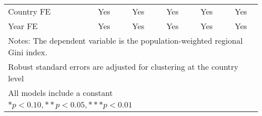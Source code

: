 {\begin{tabular}{l*{5}{c}}
Country FE          &         Yes         &         Yes         &         Yes         &         Yes         &         Yes         \\
Year FE             &         Yes         &         Yes         &         Yes         &         Yes         &         Yes         \\
\hline\hline
\multicolumn{6}{l}{\footnotesize Notes: The dependent variable is the population-weighted regional Gini index.}\\
\multicolumn{6}{l}{\footnotesize Robust standard errors are adjusted for clustering at the country level}\\
\multicolumn{6}{l}{\footnotesize All models include a constant}\\
\multicolumn{6}{l}{\footnotesize $* p<0.10, ** p<0.05, *** p<0.01$}\\
\end{tabular}
}

